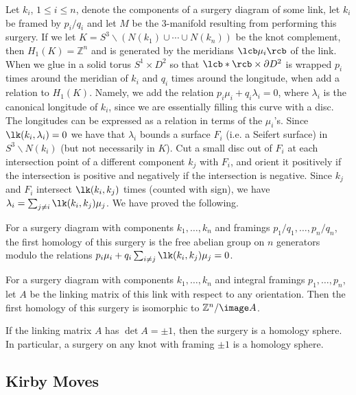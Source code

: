 Let $k_i$, $1 \leq i \leq n$, denote the components of a surgery diagram of some link, let $k_i$ be framed by $p_i/q_i$ and let $M$ be the 3-manifold resulting from performing this surgery. If we let $K = S^3 \backslash (N(k_1) \cup \cdots \cup N(k_n))$ be the knot complement, then $H_1(K) = \mathbb Z^n$ and is generated by the meridians $\lcb \mu_i \rcb$ of the link. When we glue in a solid torus $S^1 \times D^2$ so that $\lcb * \rcb \times \partial D^2$ is wrapped $p_i$ times around the meridian of $k_i$ and $q_i$ times around the longitude, when add a relation to $H_1(K)$. Namely, we add the relation $p_i\mu_i + q_i\lambda_i=0$, where $\lambda_i$ is the canonical longitude of $k_i$, since we are essentially filling this curve with a disc. The longitudes can be expressed as a relation in terms of the $\mu_i$'s. Since $\lk(k_i,\lambda_i)=0$ we have that $\lambda_i$ bounds a surface $F_i$ (i.e. a Seifert surface) in $S^3 \backslash N(k_i)$ (but not necessarily in $K$). Cut a small disc out of $F_i$ at each intersection point of a different component $k_j$ with $F_i$, and orient it positively if the intersection is positive and negatively if the intersection is negative. Since $k_j$ and $F_i$ intersect $\lk(k_i,k_j)$ times (counted with sign), we have $\lambda_i = \sum_{j \neq i} \lk(k_i,k_j) \mu_j$. We have proved the following.
\begin{prop}
\label{first homology of surgery}
For a surgery diagram with components $k_1,\ldots,k_n$ and framings $p_1/q_1,\ldots,p_n/q_n$, the first homology of this surgery is the free abelian group on $n$ generators modulo the relations $p_i\mu_i + q_i\sum_{i\neq j}\lk(k_i,k_j)\mu_j=0$. 
\end{prop}
\begin{cor}
\label{first homology of integral surgery}
For a surgery diagram with components $k_1,\ldots,k_n$ and integral framings $p_1,\ldots,p_n$, let $A$ be the linking matrix of this link with respect to any orientation. Then the first homology of this surgery is isomorphic to $\mathbb Z^n / \image A$.
\end{cor}
\begin{cor}
If the linking matrix $A$ has $\det A = \pm 1$, then the surgery is a homology sphere. In particular, a surgery on any knot with framing $\pm 1$ is a homology sphere.
\end{cor}





\subsection{Kirby Moves}
\label{Kirby Moves}


